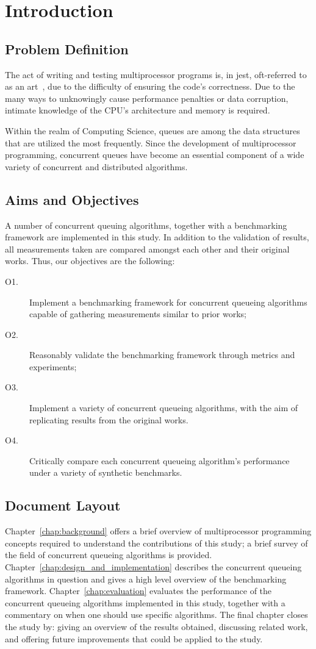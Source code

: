 \chapter{Introduction}
\section{Problem Definition}

The act of writing and testing multiprocessor programs is, in jest,
oft-referred to as an art~\citep{herlihy2020art}, due to the difficulty of
ensuring the code's correctness. 
Due to the many ways to unknowingly cause
performance penalties or data corruption, intimate knowledge of the CPU's
architecture and memory is required. 

Within the realm of Computing Science, queues are among the data structures that
are utilized the most frequently. Since the development of multiprocessor
programming, concurrent queues have become an essential component of a wide
variety of concurrent and distributed algorithms.

\section{Aims and Objectives}

A number of concurrent queuing algorithms, together with a benchmarking
framework are implemented in this study. In addition to the validation of results, all
measurements taken are compared amongst each other and their original works.
Thus, our objectives are the following:

\begin{description}
\item[O1.] Implement a benchmarking framework for concurrent queueing
algorithms capable of gathering measurements similar to prior works;
\item[O2.] Reasonably validate the benchmarking framework through
metrics and experiments;
\item[O3.] Implement a variety of concurrent queueing algorithms, with the aim
of replicating results from the original works.
\item[O4.] Critically compare each concurrent queueing algorithm's performance
under a variety of synthetic benchmarks.
\end{description}

\section{Document Layout}
Chapter~\ref{chap:background} offers a brief overview of multiprocessor
programming concepts required to understand the contributions of this study; a
brief survey of the field of concurrent queueing algorithms is provided.
Chapter~\ref{chap:design_and_implementation} describes the concurrent queueing
algorithms in question and gives a high level overview of the benchmarking
framework.
Chapter~\ref{chap:evaluation} evaluates the performance of the
concurrent queueing algorithms implemented in this study, together with a
commentary on when one should use specific algorithms. The final chapter closes
the study by: giving an overview of the results obtained, discussing related
work, and offering future improvements that could be applied to the study.